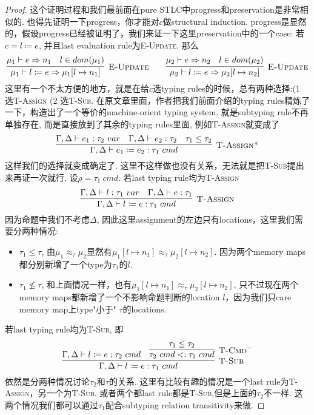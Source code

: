 \documentclass{article}
\newcommand{\termtype}[2]{\ensuremath{#1:#2}}
\begin{document}
\begin{proof}
\rm 这个证明过程和我们最前面在pure STLC中progress和preservation是非常相似的. 也得先证明一下progress，你才能对$c$做structural induction. progress是显然的，假设progress已经被证明了，我们来证一下这里preservation中的一个case: 若$c = l \coloneqq e$, 并且last evaluation rule为\textsc{E-Update}. 那么
\[
	\infer[\textsc{E-Update}]{\mu_1 \vdash l \coloneqq e \Rightarrow \mu_1[l \mapsto n_1]}{\mu_1 \vdash e \Rightarrow n_1 & l \in dom(\mu_1)} \quad\quad \infer[\textsc{E-Update}]{\mu_2 \vdash l \coloneqq e \Rightarrow \mu_2[l \mapsto n_2]}{\mu_2 \vdash e \Rightarrow n_2 & l \in dom(\mu_2)}
\]
这里有一个不太方便的地方，就是在给$c$选typing rules的时候，总有两种选择:(1 选\textsc{T-Assign} (2 选\textsc{T-Sub}. 在原文章\cite{DGC}里面，作者把我们前面介绍的typing rules精炼了一下，构造出了一个等价的machine-orient typing system. 就是subtyping rule不再单独存在, 而是直接放到了其余的typing rules里面, 例如\textsc{T-Assign}就变成了
\[
	\infer[\textsc{T-Assign*}]{\Gamma, \Delta \vdash \termtype{e_1 \coloneqq e_2}{\tau_1~cmd}}{\Gamma, \Delta \vdash \termtype{e_1}{\tau_2~var} & \Gamma, \Delta \vdash \termtype{e_2}{\tau_2} & \tau_1 \leq \tau_2}
\]
这样我们的选择就变成确定了. 这里不这样做也没有关系，无法就是把\textsc{T-Sub}提出来再证一次就行. 设$\rho = \tau_1~cmd$. 若last typing rule均为\textsc{T-Assign}
\[
	\infer[\textsc{T-Assign}]{\Gamma, \Delta \vdash \termtype{l \coloneqq e}{\tau_1~cmd}}{\Gamma, \Delta \vdash \termtype{l}{\tau_1~var} & \Gamma, \Delta \vdash \termtype{e}{\tau_1}}	
\]
因为命题中我们不考虑$\Delta$, 因此这里assignment的左边只有locations，这里我们需要分两种情况:
\begin{itemize}
	\item $\tau_1 \leq \tau$, 由$\mu_1 \approx_\tau \mu_2$显然有$\mu_1[l \mapsto n_1]\approx_\tau \mu_2[l \mapsto n_2]$. 因为两个memory maps都分别新增了一个type为$\tau_1$的$l$.
	\item $\tau_1 \nleq \tau$, 和上面情况一样，也有$\mu_1[l \mapsto n_1]\approx_\tau \mu_2[l \mapsto n_2]$, 只不过现在两个memory maps都新增了一个不影响命题判断的location $l$，因为我们只care memory map上type"小于" $\tau$的locations.
\end{itemize}  

若last typing rule均为\textsc{T-Sub}, 即
\[
	\infer[\textsc{T-Sub}]{\Gamma, \Delta \vdash \termtype{l \coloneqq e}{\tau_1~cmd}}{\Gamma, \Delta \vdash \termtype{l \coloneqq e}{\tau_2~cmd} & \infer[\textsc{T-Cmd}^-]{\tau_2~cmd <: \tau_1~cmd}{\tau_1 \leq \tau_2}}
\]
依然是分两种情况讨论$\tau_2$和$\tau$的关系. 这里有比较有趣的情况是一个last rule为\textsc{T-Assign}，另一个为\textsc{T-Sub}. 或者两个都last rule都是\textsc{T-Sub},但是上面的$\tau_2$不一样. 这两个情况我们都可以通过$\tau_1$配合subtyping relation transitivity来做.
\end{proof}
\end{document}
